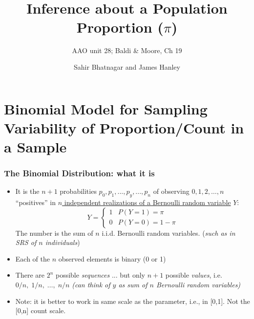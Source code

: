 \documentclass[handout]{beamer}\usepackage[]{graphicx}\usepackage[]{color}
\begin{document}




\title{Inference about a Population Proportion ($\pi$)}
\subtitle{AAO unit 28; Baldi \& Moore, Ch 19}
\author{Sahir Bhatnagar and James Hanley}


\maketitle

\section{Binomial Model for Sampling Variability of Proportion/Count in a Sample}




\begin{frame}
\frametitle{The Binomial Distribution: what it is}
\small
\begin{itemize}
	\setlength\itemsep{0.5em}
	\item It is the $n+1$ probabilities $p_{0}, p_{1}, ..., p_{y}, ..., p_{n}$ of observing 
	$0, 1, 2, \dots , n$ ``positives''  in \underline{$n$ independent realizations of a Bernoulli random variable} $Y$:
	$$
	Y = \begin{cases}
	1 & P(Y=1) = \pi \\
	0 & P(Y=0) = 1-\pi
	\end{cases}	
	$$
	The number is the sum of $n$ i.i.d. Bernoulli random variables.
	(\emph{such as in SRS of $n$ individuals}) \pause 
	\item Each of the $n$ observed elements is binary (0 or 1) \pause 
	\item There are $2^{n}$ possible \textit{sequences} ... but only $n+1$ possible \textit{values}, 
	i.e. $0/n,\;1/n,\;\dots ,\;n/n$  \emph{(can think of $y$ as sum of $n$ Bernoulli random variables)} 
	\item Note: it is better to work in same scale as the parameter, i.e., in [0,1]. Not the [0,n] count scale.
\end{itemize}
\end{frame}	
	
\end{document}
